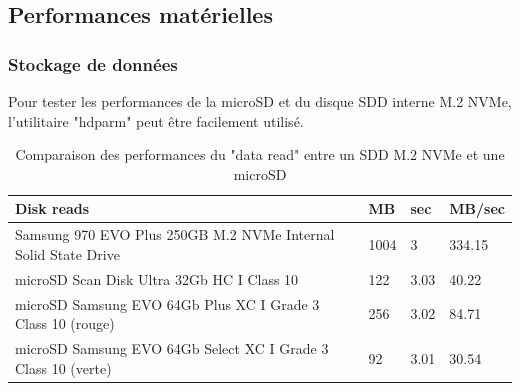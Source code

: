 ﻿\subsection{Performances matérielles}
\subsubsection{Stockage de données}
\par Pour tester les performances de la microSD et du disque SDD interne M.2 NVMe, l'utilitaire "hdparm" peut être facilement utilisé. 
{
   \vspace{0.3em} %
   \renewcommand*{\arraystretch}{1.4}
   \begin{longtable}[t]{@{}|p{25em}|p{2em}|p{2em}|p{3em}|@{}} 
      \caption{Comparaison des performances du "data read" entre un SDD M.2 NVMe et une microSD}\label{tab:Timing O_DIRECT disk reads}\\
      \hline
      \textbf{Disk reads} & \textbf{MB} & \textbf{sec} & \textbf{MB/sec}\\
      \hline
      Samsung 970 EVO Plus 250GB M.2 NVMe Internal Solid State Drive & 1004 & 3 & 334.15\\
      \hline
      microSD Scan Disk Ultra 32Gb HC I Class 10 & 122 & 3.03 & 40.22\\
      \hline
      microSD Samsung EVO 64Gb Plus XC I Grade 3 Class 10 (rouge) & 256 & 3.02 & 84.71\\
      \hline
      microSD Samsung EVO 64Gb Select XC I Grade 3 Class 10 (verte) & 92 & 3.01 & 30.54\\
      \hline
   \end{longtable}
}

